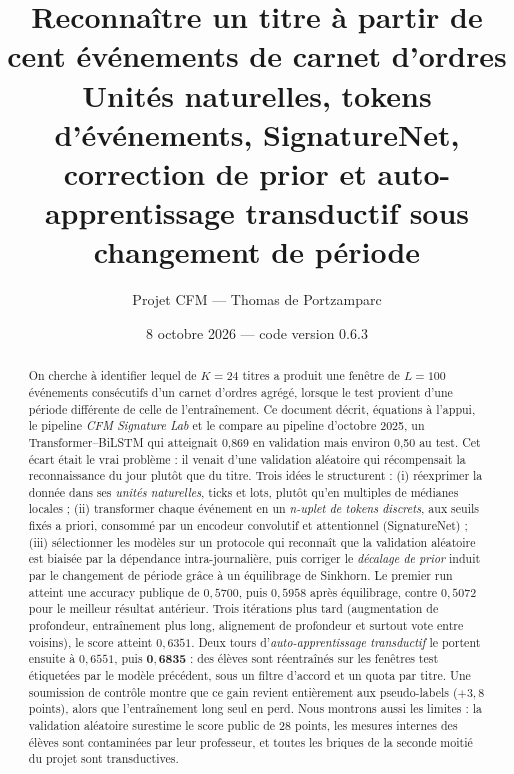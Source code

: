 \documentclass[11pt,a4paper]{article}
\title{\textbf{Reconnaître un titre à partir de cent événements de carnet d'ordres}\\[4pt]
\large Unités naturelles, tokens d'événements, SignatureNet,\\correction de prior et auto-apprentissage transductif sous changement de période}
\author{Projet CFM — Thomas de Portzamparc}
\date{8 octobre 2026 — code \code{CFM/} version 0.6.3}
\theoremstyle{definition}
\theoremstyle{plain}
\theoremstyle{remark}
\newcommand{\1}{\mathbf{1}}
\begin{document}
\maketitle

\begin{abstract}
\noindent On cherche à identifier lequel de $K=24$ titres a produit une fenêtre de $L=100$ événements consécutifs d'un carnet d'ordres agrégé, lorsque le test provient d'une période différente de celle de l'entraînement. Ce document décrit, équations à l'appui, le pipeline \emph{CFM Signature Lab} et le compare au pipeline d'octobre 2025, un Transformer--BiLSTM qui atteignait 0,869 en validation mais environ 0,50 au test. Cet écart était le vrai problème : il venait d'une validation aléatoire qui récompensait la reconnaissance du jour plutôt que du titre.
Trois idées le structurent : (i) réexprimer la donnée dans ses \emph{unités naturelles}, ticks et lots, plutôt qu'en multiples de médianes locales ; (ii) transformer chaque événement en un \emph{n-uplet de tokens discrets}, aux seuils fixés a priori, consommé par un encodeur convolutif et attentionnel (SignatureNet) ; (iii) sélectionner les modèles sur un protocole qui reconnaît que la validation aléatoire est biaisée par la dépendance intra-journalière, puis corriger le \emph{décalage de prior} induit par le changement de période grâce à un équilibrage de Sinkhorn.
Le premier run atteint une accuracy publique de $0{,}5700$, puis $0{,}5958$ après équilibrage, contre $0{,}5072$ pour le meilleur résultat antérieur. Trois itérations plus tard (augmentation de profondeur, entraînement plus long, alignement de profondeur et surtout vote entre voisins), le score atteint $0{,}6351$. Deux tours d'\emph{auto-apprentissage transductif} le portent ensuite à $0{,}6551$, puis $\mathbf{0{,}6835}$ : des élèves sont réentraînés sur les fenêtres test étiquetées par le modèle précédent, sous un filtre d'accord et un quota par titre. Une soumission de contrôle montre que ce gain revient entièrement aux pseudo-labels ($+3{,}8$ points), alors que l'entraînement long seul en perd. Nous montrons aussi les limites : la validation aléatoire surestime le score public de 28 points, les mesures internes des élèves sont contaminées par leur professeur, et toutes les briques de la seconde moitié du projet sont transductives.
\end{abstract}

\tableofcontents
\clearpage




















\appendix

\end{document}
